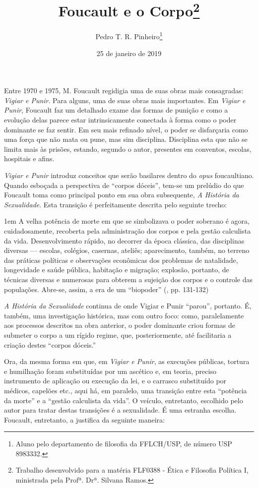 \documentclass[12pt,a4paper]{article}
\author{Pedro T. R. Pinheiro\footnote{Aluno pelo departamento de filosofia 
da FFLCH/USP, de número USP 8983332. }}
\title{Foucault e o Corpo\footnote{
	Trabalho desenvolvido para a matéria FLF0388 - Ética e Filosofia 
	Política I, ministrada pela Profª. Drª. Silvana Ramos. }}
\date{25 de janeiro de 2019}
\newenvironment{citac}
{
	\begin{addmargin}
		[4cm]{1em} \footnotesize}{\normalfont 
	\end{addmargin}
}
\begin{document}
	\maketitle
	
	\onehalfspacing
	\setlength{\parskip}{0.5cm}
	
	Entre 1970 e 1975, M. Foucault regidigia uma de suas obras mais 
	consagradas: \textit{Vigiar e Punir}. Para alguns, uma de suas 
	obras mais importantes. Em \textit{Vigiar e Punir}, Foucault faz 
	um detalhado exame das formas de punição e como a evolução delas 
	parece estar intrinsicamente conectada à forma como o poder dominante 
	se faz sentir. Em seu mais refinado nível, o poder se disfarçaria 
	como uma força que não mata ou pune, mas sim disciplina. Disciplina 
	esta que não se limita mais às prisões, estando, segundo o autor, 
	presentes em conventos, escolas, hospitais e afins. 
	
	\textit{Vigiar e Punir} introduz conceitos que serão basilares 
	dentro do \textit{opus} foucaultiano. Quando esboçada a perspectiva 
	de ``corpos dóceis'', tem-se um prelúdio do que Foucault toma como 
	principal ponto em sua obra subsequente, \textit{A História da 
	Sexualidade}. Esta transição é perfeitamente descrita pelo seguinte 
	trecho: 
	
	\begin{citac}
	A velha potência de morte em que se simbolizava o poder soberano 
	é agora, cuidadosamente, recoberta pela administração dos corpos e pela 
	gestão calculista da vida. Desenvolvimento rápido, no decorrer da época 
	clássica, das disciplinas diversas --- escolas, colégios, casernas, 
	ateliês; aparecimento, também, no terreno das práticas políticas e 
	observações econômicas dos problemas de natalidade, longevidade e 
	saúde pública, habitação e migração; explosão, portanto, de técnicas 
	diversas e numerosas para obterem a sujeição dos corpos e o controle 
	das populações. Abre-se, assim, a era de um ``biopoder''
	(\cite{hs}, pp. 131-132)
	\end{citac}
	
	\textit{A História da Sexualidade} continua de onde {Vigiar e Punir} 
	``parou'', portanto. É, também, uma investigação histórica, mas com 
	outro foco: como, paralelamente aos processos descritos na obra anterior, 
	o poder dominante criou formas de submeter o corpo a um rígido regime, 
	que, posteriormente, até facilitaria a criação destes ``corpos dóceis.''
	
	\newpage
	
	Ora, da mesma forma em que, em \textit{Vigiar e Punir}, as execuções 
	públicas, tortura e humilhação foram substituídas por um ascético e, em 
	teoria, preciso instrumento de aplicação ou execução da lei, e o carrasco 
	substituído por médicos, capelões etc., aqui há, em paralelo, uma 
	transição entre esta ``potência da morte'' e a ``gestão calculista da 
	vida''. O veículo, entretanto, escolhido pelo autor para tratar destas 
	transições é a sexualidade. É uma estranha escolha. Foucault, entretanto, 
	a justifica da seguinte maneira: 
	
\end{document}
